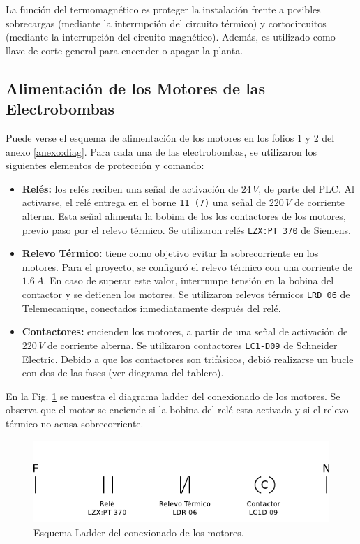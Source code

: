 La función del termomagnético es proteger la instalación frente a posibles
sobrecargas (mediante la interrupción del circuito térmico) y cortocircuitos
(mediante la interrupción del circuito magnético).
Además, es utilizado como llave de corte general para encender o apagar la
planta.

\subsection{Alimentación de los Motores de las Electrobombas}
\label{subsec:alimentacionMotores}
Puede verse el esquema de alimentación de los motores en los folios 1 y 2 del
anexo \ref{anexo:diag}.
Para cada una de las electrobombas, se utilizaron los siguientes elementos de
protección y comando:
\begin{itemize}
 \item \textbf{Relés:}
 los relés reciben una señal de activación de $24\,V$, de parte del PLC.
 Al activarse, el relé entrega en el borne \verb|11 (7)| una señal de $220\,V$
de corriente alterna.
Esta señal alimenta la bobina de los los contactores de los motores, previo
paso por el relevo térmico. Se utilizaron relés \verb|LZX:PT 370| de Siemens.
 \item \textbf{Relevo Térmico:}
 tiene como objetivo evitar la sobrecorriente en los motores.
 Para el proyecto, se configuró el relevo térmico con una corriente
 de $1.6\,A$.
 En caso de superar este valor, interrumpe tensión en la bobina
 del contactor y se detienen los motores.
 Se utilizaron relevos térmicos \verb|LRD 06| de Telemecanique, conectados
inmediatamente después del relé.
 \item \textbf{Contactores:}
 encienden los motores, a partir de una señal de activación de $220\,V$ de
corriente alterna.
Se utilizaron contactores \verb|LC1-D09| de Schneider Electric.
Debido a que los contactores son trifásicos, debió realizarse un bucle con dos
de las fases (ver diagrama del tablero).
\end{itemize}

En la Fig. \ref{fig:diagramaLadderContactor} se muestra el diagrama ladder
del conexionado de los motores.
Se observa que  el motor se enciende si la bobina del relé esta activada y
si el relevo térmico no acusa sobrecorriente.

\begin{figure}
 \centering
 \includegraphics[scale=1.1]{Cap3-TableroElectrico/Images/ladderConexion.pdf}
 \caption{Esquema Ladder del conexionado de los motores.}
 \label{fig:diagramaLadderContactor}
\end{figure}

